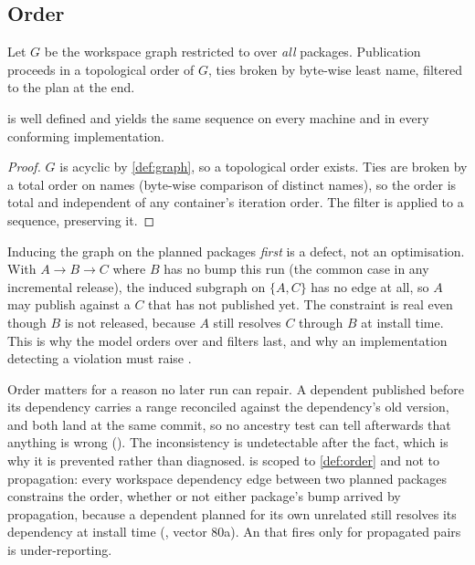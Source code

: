 \subsection{Order}

\begin{definition}
\label{def:order}
Let $G$ be the workspace graph restricted to  over
\emph{all} packages. Publication proceeds in a topological order of $G$, ties
broken by byte-wise least name, filtered to the plan at the end.
\end{definition}

\begin{proposition}
\label{prop:order}
 is well defined and yields the same sequence on every machine
and in every conforming implementation.
\end{proposition}

\begin{proof}
$G$ is acyclic by \cref{def:graph}, so a topological order exists. Ties are
broken by a total order on names (byte-wise comparison of distinct names), so
the order is total and independent of any container's iteration order. The
filter is applied to a sequence, preserving it.
\end{proof}

\begin{remark}
\label{rem:filter-last}
Inducing the graph on the planned packages \emph{first} is a defect, not an
optimisation. With $A \to B \to C$ where $B$ has no bump this run (the
common case in any incremental release), the induced subgraph on $\{A, C\}$
has no edge at all, so $A$ may publish against a $C$ that has not published
yet. The constraint is real even though $B$ is not released, because $A$ still
resolves $C$ through $B$ at install time. This is why the model orders over
\Pkgs{} and filters last, and why an implementation detecting a violation must
raise .
\end{remark}

Order matters for a reason no later run can repair. A dependent published
before its dependency carries a range reconciled against the dependency's old
version, and both land at the same commit, so no ancestry test can tell
afterwards that anything is wrong (). The inconsistency is
undetectable after the fact, which is why it is prevented rather than
diagnosed.  is scoped to \cref{def:order} and not to propagation:
every workspace dependency edge between two planned packages constrains the
order, whether or not either package's bump arrived by propagation, because a
dependent planned for its own unrelated  still resolves its
dependency at install time (, vector 80a). An  that fires
only for propagated pairs is under-reporting.

